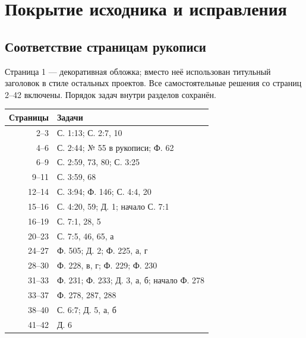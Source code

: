 \section{Покрытие исходника и исправления}
\subsection*{Соответствие страницам рукописи}
Страница 1 --- декоративная обложка; вместо неё использован титульный
заголовок в стиле остальных проектов. Все самостоятельные решения
со страниц 2--42 включены. Порядок задач внутри разделов сохранён.
\begin{center}
\begin{tabular}{r|p{12.5cm}}
Страницы & Задачи\\\hline
2--3 & С. 1:13; С. 2:7, 10\\
4--6 & С. 2:44; № 55 в рукописи; Ф. 62\\
6--9 & С. 2:59, 73, 80; С. 3:25\\
9--11 & С. 3:59, 68\\
12--14 & С. 3:94; Ф. 146; С. 4:4, 20\\
15--16 & С. 4:20, 59; Д. 1; начало С. 7:1\\
16--19 & С. 7:1, 28, 5\\
20--23 & С. 7:5, 46, 65, а\\
24--27 & Ф. 505; Д. 2; Ф. 225, а, г\\
28--30 & Ф. 228, в, г; Ф. 229; Ф. 230\\
31--33 & Ф. 231; Ф. 233; Д. 3, а, б; начало Ф. 278\\
33--37 & Ф. 278, 287, 288\\
38--40 & С. 6:7; Д. 5, а, б\\
41--42 & Д. 6
\end{tabular}
\end{center}
